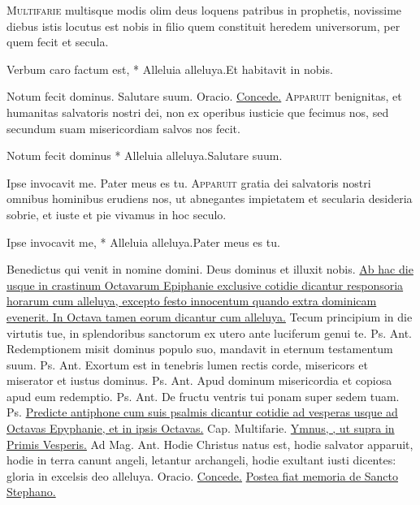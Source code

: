 \begin{multicols*}{2}
\lettrine[lines=2]{\zallmancaps \color{Red} M}{ultifarie} multisque modis olim deus loquens patribus in prophetis, novissime diebus istis locutus est nobis in filio quem constituit heredem universorum, per quem fecit et secula.
\begin{responsory-breve}
{Verbum caro factum est, * Alleluia alleluya.}{Et habitavit in nobis.}
\end{responsory-breve}
\V Notum fecit dominus. \R Salutare suum. {\color{Red} Oracio.} \hyperlink{concede-nativitas}{Concede.}
\lettrine[lines=2]{\zallmancaps \color{Blue} A}{pparuit} benignitas, et humanitas salvatoris nostri dei, non ex operibus iusticie que fecimus nos, sed secundum suam misericordiam salvos nos fecit.
\begin{responsory-breve}
{Notum fecit dominus * Alleluia alleluya.}{Salutare suum.}
\end{responsory-breve}
\V Ipse invocavit me. \R Pater meus es tu.
\lettrine[lines=2]{\zallmancaps \color{Red} A}{pparuit} gratia dei salvatoris nostri omnibus hominibus erudiens nos, ut abnegantes impietatem et secularia desideria sobrie, et iuste et pie vivamus in hoc seculo.
\begin{responsory-breve}
{Ipse invocavit me, * Alleluia alleluya.}{Pater meus es tu.}
\end{responsory-breve}
\V Benedictus qui venit in nomine domini. \R Deus dominus et illuxit nobis.
\newline \ul{Ab hac die usque in crastinum Octavarum Epiphanie exclusive cotidie dicantur responsoria horarum cum alleluya, excepto festo innocentum quando extra dominicam evenerit. In Octava tamen eorum dicantur cum alleluya.}
 Tecum principium in die virtutis tue, in splendoribus sanctorum ex utero ante luciferum genui te. {\color{Red} Ps.}  {\color{Red} Ant.} Redemptionem misit dominus populo suo, mandavit in eternum testamentum suum. {\color{Red} Ps.}  {\color{Red} Ant.} Exortum est in tenebris lumen rectis corde, misericors et miserator et iustus dominus. {\color{Red} Ps.}  {\color{Red} Ant.} Apud dominum misericordia et copiosa apud eum redemptio. {\color{Red} Ps.}  {\color{Red} Ant.} De fructu ventris tui ponam super sedem tuam. {\color{Red} Ps.} 
\newline \ul{Predicte antiphone cum suis psalmis dicantur cotidie ad vesperas usque ad Octavas Epyphanie, et in ipsis Octavas.} {\color{Red} Cap.} Multifarie. \ul{Ymnus, \Vbar , ut supra in Primis Vesperis.} {\color{Red} Ad Mag. Ant.} Hodie Christus natus est, hodie salvator apparuit, hodie in terra canunt angeli, letantur archangeli, hodie exultant iusti dicentes: gloria in excelsis deo alleluya. {\color{Red} Oracio.} \hyperlink{concede-nativitas}{Concede.} \ul{Postea fiat memoria de Sancto Stephano.}

\end{multicols*}
